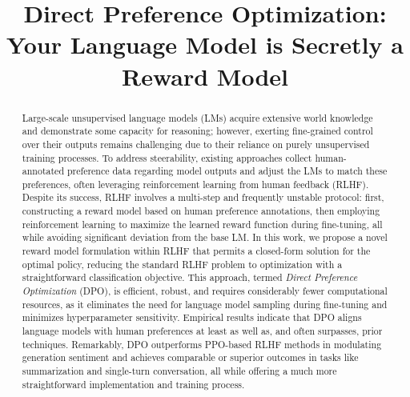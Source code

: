 \title{Direct Preference Optimization: Your Language Model is Secretly a Reward Model}

\begin{abstract}
Large-scale unsupervised language models (LMs) acquire extensive world knowledge and demonstrate some capacity for reasoning; however, exerting fine-grained control over their outputs remains challenging due to their reliance on purely unsupervised training processes. To address steerability, existing approaches collect human-annotated preference data regarding model outputs and adjust the LMs to match these preferences, often leveraging reinforcement learning from human feedback (RLHF). Despite its success, RLHF involves a multi-step and frequently unstable protocol: first, constructing a reward model based on human preference annotations, then employing reinforcement learning to maximize the learned reward function during fine-tuning, all while avoiding significant deviation from the base LM. In this work, we propose a novel reward model formulation within RLHF that permits a closed-form solution for the optimal policy, reducing the standard RLHF problem to optimization with a straightforward classification objective. This approach, termed \textit{Direct Preference Optimization} (DPO), is efficient, robust, and requires considerably fewer computational resources, as it eliminates the need for language model sampling during fine-tuning and minimizes hyperparameter sensitivity. Empirical results indicate that DPO aligns language models with human preferences at least as well as, and often surpasses, prior techniques. Remarkably, DPO outperforms PPO-based RLHF methods in modulating generation sentiment and achieves comparable or superior outcomes in tasks like summarization and single-turn conversation, all while offering a much more straightforward implementation and training process.
\end{abstract}

